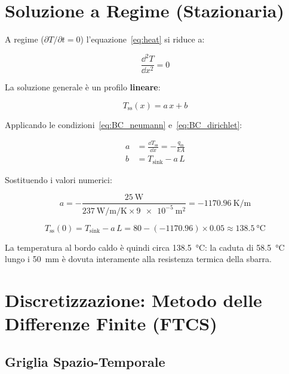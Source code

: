\documentclass[11pt, a4paper]{article}
\begin{document}
\section{Soluzione a Regime (Stazionaria)}

A regime ($\partial T / \partial t = 0$) l'equazione~\eqref{eq:heat} si riduce a:

\begin{equation}
  \frac{\dd^2 T}{\dd x^2} = 0
  \label{eq:laplace1D}
\end{equation}

La soluzione generale è un profilo \textbf{lineare}:

\begin{equation}
  T_\text{ss}(x) = a\, x + b
  \label{eq:lin}
\end{equation}

Applicando le condizioni~\eqref{eq:BC_neumann} e~\eqref{eq:BC_dirichlet}:

\begin{align}
  a &= \frac{\dd T_\text{ss}}{\dd x} = -\frac{q_\text{in}}{k A} \label{eq:a}\\[6pt]
  b &= T_\text{sink} - a\, L \label{eq:b}
\end{align}

Sostituendo i valori numerici:

\begin{equation}
  a = -\frac{\SI{25}{\watt}}{\SI{237}{\watt\per\meter\per\kelvin} \times \SI{9e-5}{\meter\squared}}
    = \SI{-1170.96}{\kelvin\per\meter}
\end{equation}

\begin{equation}
  T_\text{ss}(0) = T_\text{sink} - a\,L = 80 - (-1170.96) \times 0.05 \approx \SI{138.5}{\celsius}
\end{equation}

La temperatura al bordo caldo è quindi circa \SI{138.5}{\celsius}: la caduta di \SI{58.5}{\celsius} lungo i \SI{50}{\milli\meter} è dovuta interamente alla resistenza termica della sbarra.

\section{Discretizzazione: Metodo delle Differenze Finite (FTCS)}

\subsection{Griglia Spazio-Temporale}
\end{document}
